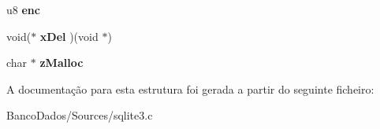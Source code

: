 \begin{DoxyCompactItemize}
\item 
\hypertarget{struct_mem_af437c99e92b8e729b70f82fa94e96bff}{u8 {\bfseries enc}}\label{struct_mem_af437c99e92b8e729b70f82fa94e96bff}

\item 
\hypertarget{struct_mem_a081ea2f86933d68a8940785b62f638ef}{void($\ast$ {\bfseries x\-Del} )(void $\ast$)}\label{struct_mem_a081ea2f86933d68a8940785b62f638ef}

\item 
\hypertarget{struct_mem_a68cd8f196d9dc8ab27845e1b4abbc95c}{char $\ast$ {\bfseries z\-Malloc}}\label{struct_mem_a68cd8f196d9dc8ab27845e1b4abbc95c}

\end{DoxyCompactItemize}


A documentação para esta estrutura foi gerada a partir do seguinte ficheiro\-:\begin{DoxyCompactItemize}
\item 
Banco\-Dados/\-Sources/sqlite3.\-c\end{DoxyCompactItemize}
